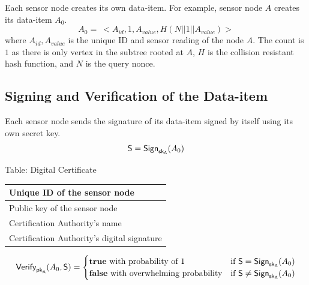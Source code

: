 \documentclass[%
  slidesonly,%
  semlayer%
  ]{seminar}                                  %
\newcommand{\sk}{\sf{sk}}
\newcommand{\pk}{\sf{pk}}
\begin{document}
\begin{slide}
      Each sensor node creates its own data-item. 
      For example, sensor node $A$ creates its data-item $A_{0}$.
      \begin{equation*}
        A_{0} =\ <A_{id}, 1, A_{value}, H(N||1||A_{value})>
      \end{equation*}
      where $A_{id}, A_{value}$ is the unique ID and sensor reading of the node $A$. 
      The count is $1$ as there is only vertex in the subtree rooted at $A$, $H$ is the collision resistant hash function, and $N$ is the query nonce.
      \vfill
    \clearpage

    \subsection*{Signing and Verification of the Data-item}
      \vfill
      Each sensor node sends the signature of its data-item signed by itself using its own secret key. 
      \begin{equation*}
          \textsf{S} = \textsf{Sign}_{\sk_{A}}(A_{0})
        \end{equation*}
        \begin{center}
          Table: Digital Certificate
      \end{center}
      \begin{table} 
        \tiny 
          \centering
          \begin{tabular}{ |l| }
              \hline
              Unique ID of the sensor node \\
              \hline
              Public key of the sensor node \\  
              \hline
              Certification Authority's name \\
              \hline
              Certification Authority's digital signature \\
              \hline
          \end{tabular}
      \end{table}

      \begin{equation*}
        \textsf{Verify}_{\pk_{A}}(A_{0},\textsf{S}) = 
        \begin{cases}
         \textbf{true}\ \mbox{with probability of 1} & \mbox{if}\ \textsf{S} = \textsf{Sign}_{\sk_{A}}(A_{0})\\
         \textbf{false}\ \mbox{with overwhelming probability} & \mbox{if}\ \textsf{S} \neq \textsf{Sign}_{\sk_{A}}(A_{0})
        \end{cases}
      \end{equation*}
      \vfill
      \clearpage


\end{slide}
\end{document}
